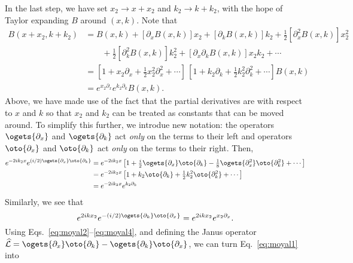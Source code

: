 %
In the last step, we have set $x_{2} \to x + x_{2}$ and $k_{2} \to k + k_{2}$, with the hope of Taylor expanding $B$ around $(x, k)$.
Note that
%
\begin{equation}
  \begin{aligned}
    B(x + x_{2}, k + k_{2}) &= B(x, k) + [\partial_{x} B(x, k)]x_{2} + [\partial_{k} B(x, k)] k_{2} + \tfrac{1}{2} [\partial^{2}_{x} B(x, k)] x_{2}^{2}\\
    &\qquad + \tfrac{1}{2} [\partial^{2}_{k} B(x, k)] k_{2}^{2} + [\partial_{x}\partial_{k} B(x, k)] x_{2}k_{2} + \cdots \\
    &= \left[1 + x_{2}\partial_{x} + \tfrac{1}{2}x_{2}^{2}\partial^{2}_{x} + \cdots \right]\,
  \left[1 + k_{2}\partial_{k} + \tfrac{1}{2}k_{2}^{2}\partial^{2}_{k} + \cdots \right] B(x, k)\\
    &= e^{x_{2}\partial_{x}} e^{k_{2}\partial_{k}} B(x, k).\label{eq:moyal2}
  \end{aligned}
\end{equation}
%
Above, we have made use of the fact that the partial derivatives are with respect to $x$ and $k$ so that $x_{2}$ and $k_{2}$ can be treated as constants that can be moved around.
To simplify this further, we introdue new notation: the operators $\ogets{\partial_{x}}$ and $\ogets{\partial_{k}}$ act \emph{only} on the terms to their left and operators $\oto{\partial_{x}}$ and $\oto{\partial_{k}}$ act \emph{only} on the terms to their right.
Then,
%
\begin{equation}
  \begin{aligned}
    e^{-2ik_{2}x} e^{(i/2)\ogets{\partial_{x}}\oto{\partial_{k}}} &= e^{-2ik_{2}x} \left[1 +  \tfrac{i}{2}\ogets{\partial_{x}}\oto{\partial_{k}} - \tfrac{1}{8}\ogets{\partial^{2}_{x}}\oto{\partial^{2}_{k}} + \cdots \right]\\
                                                            &= e^{-2ik_{2}x} \left[1 +  k_{2}\oto{\partial_{k}} + \tfrac{1}{2}k_{2}^{2}\oto{\partial^{2}_{k}} + \cdots \right]\\
                                                            &= e^{-2ik_{2}x}e^{k_{2}\partial_{k}}
  \end{aligned}\label{eq:moyal3}
\end{equation}
%
Similarly, we see that
%
\begin{equation}
  e^{2ikx_{2}}e^{-(i/2)\ogets{\partial_{k}}\oto{\partial_{x}}} = e^{2ikx_{2}}e^{x_{2}\partial_{x}}.\label{eq:moyal4}
\end{equation}
%
Using Eqs.~\eqref{eq:moyal2}--\eqref{eq:moyal4}, and defining the Janus operator $\widehat{\mathcal{L}} = \ogets{\partial_{x}} \oto{\partial_{k}} - \ogets{\partial_{k}}\oto{\partial_{x}}$, we can turn Eq.~\eqref{eq:moyal1} into
